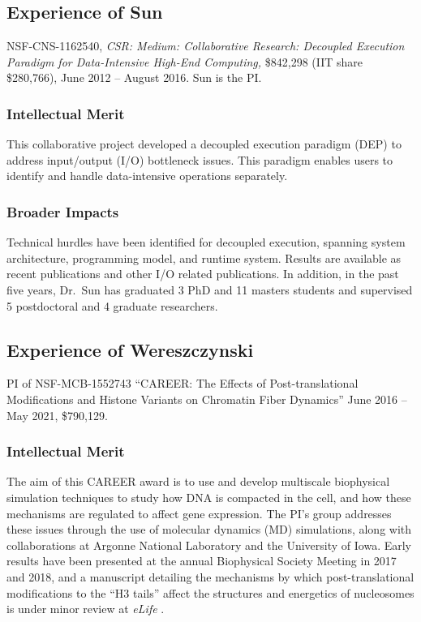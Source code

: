 \documentclass[11pt]{NSFamsart}
\begin{document}
\subsection{Experience of Sun}  NSF-CNS-1162540, \emph{CSR: Medium: Collaborative Research: Decoupled Execution Paradigm for Data-Intensive High-End Computing,} \$842,298 (IIT share \$280,766), June 2012 -- August 2016. Sun is the PI.  
\subsubsection{Intellectual Merit} This collaborative project developed a decoupled execution paradigm (DEP) to address input/output (I/O) bottleneck issues. This paradigm enables users to identify and handle data-intensive operations separately. 

\subsubsection{Broader Impacts} Technical hurdles have been identified for decoupled execution, spanning system architecture, programming model, and runtime system. Results are available as recent publications \cite{HeWS16, HeWS16a, HWSX17, HWLS17, HWSH17, KYES16, SuWa14, WaSu14, ZLKR16} and other I/O related publications. In addition, in the past five years, Dr.~Sun has graduated 3 PhD and 11 masters students and supervised 5 postdoctoral and 4 graduate researchers.



\subsection{Experience of Wereszczynski}


PI of NSF-MCB-1552743   ``CAREER: The Effects of Post-translational Modifications and Histone Variants on Chromatin Fiber Dynamics'' June 2016 -- May 2021, \$790,129.

\subsubsection{Intellectual Merit} The aim of this CAREER award is to use and develop multiscale biophysical simulation techniques to study how DNA is compacted in the cell, and how these mechanisms are regulated to affect gene expression.  The PI's group addresses these issues through the use of molecular dynamics (MD) simulations, along with collaborations at Argonne National Laboratory and the University of Iowa.  Early results have been presented at the annual Biophysical Society Meeting in 2017 and 2018, and a manuscript detailing the mechanisms by which post-translational modifications to the ``H3 tails'' affect the structures and energetics of nucleosomes is under minor review at \textit{eLife} \cite{MorrisonBSW18}.
\end{document}

